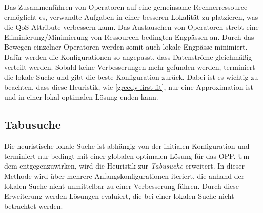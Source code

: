\documentclass{article}
\begin{document}
Das Zusammenführen von Operatoren auf eine gemeinsame Rechnerressource ermöglicht es, verwandte Aufgaben in einer besseren Lokalität zu platzieren, 
was die QoS-Attribute verbessern kann. 
Das Austauschen von Operatoren strebt eine Eliminierung/Minimierung von Ressourcen bedingten Engpässen an. 
Durch das Bewegen einzelner Operatoren werden somit auch lokale Engpässe minimiert. 
Dafür werden die Konfigurationen so angepasst, dass Datenströme gleichmäßig verteilt werden. 
Sobald keine Verbesserungen mehr gefunden werden, terminiert die lokale Suche und gibt die beste Konfiguration zurück. 
Dabei ist es wichtig zu beachten, dass diese Heuristik, wie \ref{greedy-first-fit}, nur eine Approximation ist und in einer lokal-optimalen Lösung enden kann.

 
\newpage
\subsection{Tabusuche}
Die heuristische lokale Suche ist abhängig von der initialen Konfiguration und terminiert nur bedingt 
mit einer globalen optimalen Lösung für das OPP. Um dem entgegenzuwirken, 
wird die Heuristik zur \textit{Tabusuche} \cite{glover-tabu-search} erweitert. 
In dieser Methode wird über mehrere Anfangskonfigurationen iteriert, die anhand der lokalen Suche nicht unmittelbar zu einer Verbesserung führen. 
Durch diese Erweiterung werden Lösungen evaluiert, die bei einer lokalen Suche nicht betrachtet werden.
\end{document}
